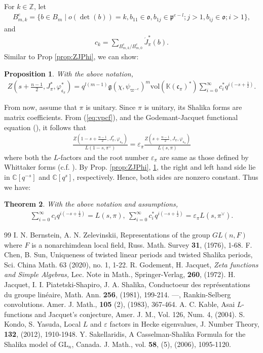 \documentclass[11pt]{amsart}
\newcommand\ep{\varepsilon}%
\newcommand\Vp{\varpi}%
\newcommand\vp{\varphi}%
\newcommand\oo{\mathfrak{o}}
\newcommand\p{{\mathfrak{p}}}
\newcommand\cf{{\mathfrak{c}}}
\newcommand\gf{\mathfrak{g}}
\newcommand\C{{\mathbb{C}}}%
\newcommand\Z{{\mathbb{Z}}}
\newcommand\K{{\mathbb{K}}}
\newcommand\1{\mathbf{1}}
\newcommand\ac{\acute}
\newcommand\GL{{\mathrm{GL}}}
\newcommand\vol{{\mathrm{vol}}}
\numberwithin{equation}{section}
\newtheorem{thm}{Theorem}[section]
\newtheorem{prop}[thm]{Proposition}
\begin{document}
For $k \in \Z$, let 
\begin{align*}
B_{m,k}^e = \{b \in B_m \mid o(\det(b)) = k, b_{11} \in \oo, b_{1j} \in \p^{e-l}; j >1 , b_{ij} \in \oo; i>1 \},
\end{align*} 
and 
\begin{align*}
c_k = \sum_{B_{m,k}^e/B_{m,0}^e} \ac{J}_\pi^*(b).
\end{align*} 
Similar to Prop \ref{prop:ZJPhi}, we can show:
\begin{prop}\label{prop:ZJ*Phi*}
With the above notation, 
\begin{align*}
Z(s + \frac{n-1}{2}, J_\pi^*, \vp_{\cf_\pi}^*) = q^{l(m-1)}\gf(\chi,\psi_{\Vp^{-e}})^{m} \vol(\K(\cf_\pi)^*)\sum_{i = 0}^\infty c_i^* q^{i(-s+\frac{1}{2})}.
\end{align*} 
\end{prop}
From now, assume that $\pi$ is unitary.
Since $\pi$ is unitary, its Shalika forms are matrix coefficients.
From (\ref{eq:vpcf}), and the Godemant-Jacquet functional equation (\cite{G-J}), it follows that 
\begin{align*}
\frac{Z(1-s+ \frac{n-1}{2}, J_\pi^*, \vp_{\cf_\pi})}{L(1-s,\pi^\vee)} = \ep_\pi \frac{Z(s+\frac{n-1}{2},J_\pi, \vp_{\cf_\pi})}{L(s,\pi)} 
\end{align*}
where both the $L$-factors and the root number $\ep_\pi$ are same as those defined by Whittaker forms (c.f. \cite{J-PS-S2}).
By Prop. \ref{prop:ZJPhi}, \ref{prop:ZJ*Phi*}, the right and left hand side lie in $\C[q^{-s}]$ and $\C[q^{s}]$, respectively.
Hence, both sides are nonzero constant.
Thus we have:
\begin{thm}\label{thm:pairnf}
With the above notation and assumptions,
\begin{align*}
\sum_{i = 0}^\infty c_i q^{i(-s+\frac{1}{2})} = L(s,\pi), \
\sum_{i = 0}^\infty c_i^* q^{i(-s+\frac{1}{2})} = \ep_\pi L(s,\pi^\vee).
\end{align*} 
\end{thm}
\begin{thebibliography}{99}
I. N. Bernstein, A. N. Zelevinskii, Representations of the group $GL(n,F)$ where $F$ is a nonarchimdean local field, Russ. Math. Survey {\bf 31}, (1976), 1-68. 
\bibitem[C-S]{C-S}F. Chen, B. Sun, Uniqueness of twisted linear periods and twisted Shalika periods, Sci. China Math. 63 (2020), no. 1, 1-22.
\bibitem[G-J]{G-J}R. Godement, H. Jacquet, {\it Zeta functions and Simple Algebras, } Lec. Note in Math., Springer-Verlag, {\bf 260}, (1972). 
\bibitem[J-PS-S]{JPSS}H. Jacquet, I. I. Piatetski-Shapiro, J. A. Shalika, Conductoeur des repr\'esentations du groupe lin\'eaire, Math. Ann. {\bf 256}, (1981), 199-214.
\bibitem[J-PS-S2]{J-PS-S2}---, Rankin-Selberg convolutions. Amer. J. Math., {\bf 105} (2), (1983), 367-464.
\bibitem[K]{K}A. C. Kable, Asai $L$-functions and Jacquet’s conjecture, Amer. J. M., Vol. 126, Num. 4, (2004).
\bibitem[K-Y]{K-Y}S. Kondo, S. Yasuda, Local $L$ and $\ep$ factors in Hecke eigenvalues, J. Number Theory, {\bf 132}, (2012), 1910-1948. 
\bibitem[S]{S}Y. Sakellaridis, {A Casselman-Shalika Formula for the Shalika model of $\GL_n$}, Canada. J. Math., vol. {\bf 58}, (5), (2006), 1095-1120.
\end{thebibliography}
\end{document}
